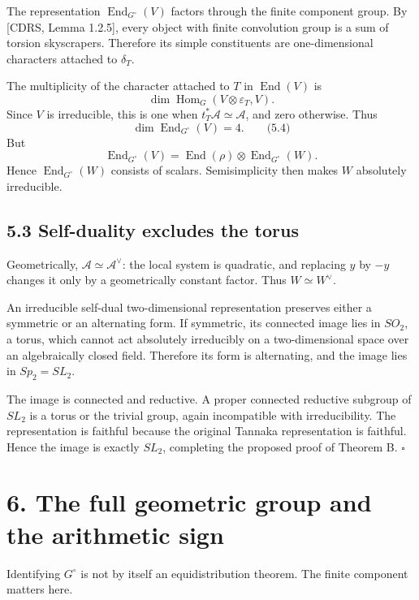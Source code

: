 \documentclass[
  11pt,
  a4paper,
]{article}
\begin{document}
The representation \(\operatorname{End}_{G^\circ}(V)\) factors through
the finite component group. By {[}CDRS, Lemma 1.2.5{]}, every object
with finite convolution group is a sum of torsion skyscrapers. Therefore
its simple constituents are one-dimensional characters attached to
\(\delta_T\).

The multiplicity of the character attached to \(T\) in
\(\operatorname{End}(V)\) is \[
\dim\operatorname{Hom}_G(V\otimes\varepsilon_T,V).
\] Since \(V\) is irreducible, this is one when
\(t_T^*\mathcal A\simeq\mathcal A\), and zero otherwise. Thus \[
\dim\operatorname{End}_{G^\circ}(V)=4.
\qquad \text{(5.4)}
\] But \[
\operatorname{End}_{G^\circ}(V)
=\operatorname{End}(\rho)\otimes\operatorname{End}_{G^\circ}(W).
\] Hence \(\operatorname{End}_{G^\circ}(W)\) consists of scalars.
Semisimplicity then makes \(W\) absolutely irreducible.

\subsection{5.3 Self-duality excludes the
torus}\label{self-duality-excludes-the-torus}

Geometrically, \(\mathcal A\simeq\mathcal A^\vee\): the local system is
quadratic, and replacing \(y\) by \(-y\) changes it only by a
geometrically constant factor. Thus \(W\simeq W^\vee\).

An irreducible self-dual two-dimensional representation preserves either
a symmetric or an alternating form. If symmetric, its connected image
lies in \(SO_2\), a torus, which cannot act absolutely irreducibly on a
two-dimensional space over an algebraically closed field. Therefore its
form is alternating, and the image lies in \(Sp_2=SL_2\).

The image is connected and reductive. A proper connected reductive
subgroup of \(SL_2\) is a torus or the trivial group, again incompatible
with irreducibility. The representation is faithful because the original
Tannaka representation is faithful. Hence the image is exactly \(SL_2\),
completing the proposed proof of Theorem B. \(\square\)

\section{6. The full geometric group and the arithmetic
sign}\label{the-full-geometric-group-and-the-arithmetic-sign}

Identifying \(G^\circ\) is not by itself an equidistribution theorem.
The finite component matters here.
\end{document}
